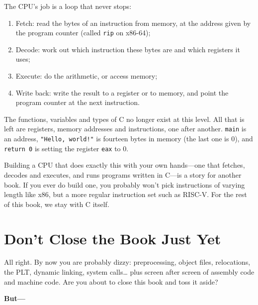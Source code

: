 The CPU's job is a loop that never stops:
\begin{enumerate}
  \item {}Fetch: read the bytes of an instruction from memory, at the address given by the program counter (called \texttt{rip} on x86-64);
  \item Decode: work out which instruction these bytes are and which registers it uses;
  \item Execute: do the arithmetic, or access memory;
  \item Write back: write the result to a register or to memory, and point the program counter at the next instruction.
\end{enumerate}

The functions, variables and types of C no longer exist at this level. All that is left are registers, memory addresses and instructions, one after another. \texttt{main} is an address, \texttt{"Hello, world!"} is fourteen bytes in memory (the last one is 0), and \texttt{return 0} is setting the register \texttt{eax} to 0.

Building a CPU that does exactly this with your own hands---one that fetches, decodes and executes, and runs programs written in C---is a story for another book. If you ever do build one, you probably won't pick instructions of varying length like x86, but a more regular instruction set such as RISC-V. For the rest of this book, we stay with C itself.

\section{Don't Close the Book Just Yet}
\label{sec:dont-quit}

All right. By now you are probably dizzy: preprocessing, object files, relocations, the PLT, dynamic linking, system calls\ldots{} plus screen after screen of assembly code and machine code. Are you about to close this book and toss it aside?

{\Large\bfseries But---}

